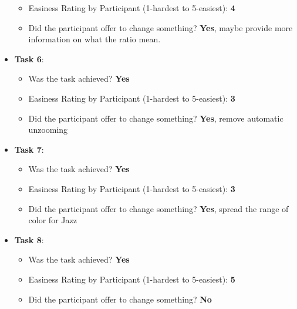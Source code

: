 \documentclass[twocolumn, letterpaper,13pt]{scrartcl}
\begin{document}
\begin{itemize}
\begin{itemize}
            \item Easiness Rating by Participant (1-hardest to 5-easiest): \textbf{4}
            \item Did the participant offer to change something? \textbf{Yes}, maybe provide more information on what the ratio mean.
        \end{itemize}
        \item \textbf{Task 6}:
        \begin{itemize}
            \item Was the task achieved? \textbf{Yes}
            \item Easiness Rating by Participant (1-hardest to 5-easiest): \textbf{3}
            \item Did the participant offer to change something? \textbf{Yes}, remove automatic unzooming
        \end{itemize}
        \item \textbf{Task 7}:
        \begin{itemize}
            \item Was the task achieved? \textbf{Yes}
            \item Easiness Rating by Participant (1-hardest to 5-easiest): \textbf{3}
            \item Did the participant offer to change something? \textbf{Yes}, spread the range of color for Jazz
        \end{itemize}
        \item \textbf{Task 8}:
        \begin{itemize}
            \item Was the task achieved? \textbf{Yes}
            \item Easiness Rating by Participant (1-hardest to 5-easiest): \textbf{5}
            \item Did the participant offer to change something? \textbf{No}
        \end{itemize}
    \end{itemize}
    
\end{document}
